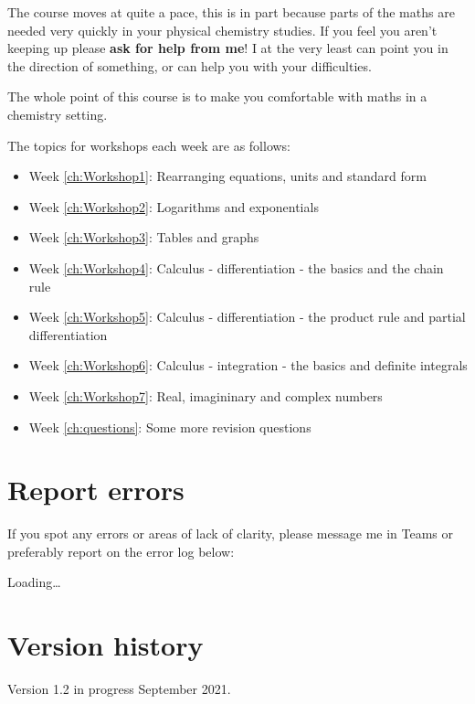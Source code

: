\documentclass[
]{book}
\providecommand{\tightlist}{%
  \setlength{\itemsep}{0pt}\setlength{\parskip}{0pt}}
\begin{document}
The course moves at quite a pace, this is in part because parts of the maths are needed very quickly in your physical chemistry studies. If you feel you aren't keeping up please \textbf{ask for help from me}! I at the very least can point you in the direction of something, or can help you with your difficulties.

The whole point of this course is to make you comfortable with maths in a chemistry setting.

The topics for workshops each week are as follows:

\begin{itemize}
\tightlist
\item
  Week \ref{ch:Workshop1}: Rearranging equations, units and standard form
\item
  Week \ref{ch:Workshop2}: Logarithms and exponentials
\item
  Week \ref{ch:Workshop3}: Tables and graphs
\item
  Week \ref{ch:Workshop4}: Calculus - differentiation - the basics and the chain rule
\item
  Week \ref{ch:Workshop5}: Calculus - differentiation - the product rule and partial differentiation
\item
  Week \ref{ch:Workshop6}: Calculus - integration - the basics and definite integrals
\item
  Week \ref{ch:Workshop7}: Real, imagininary and complex numbers
\item
  Week \ref{ch:questions}: Some more revision questions
\end{itemize}

\hypertarget{report-errors}{%
\section*{Report errors}\label{report-errors}}

If you spot any errors or areas of lack of clarity, please message me in Teams or preferably report on the error log below:

Loading\ldots{}

\hypertarget{version-history}{%
\section*{Version history}\label{version-history}}

Version 1.2 in progress September 2021.
\end{document}
